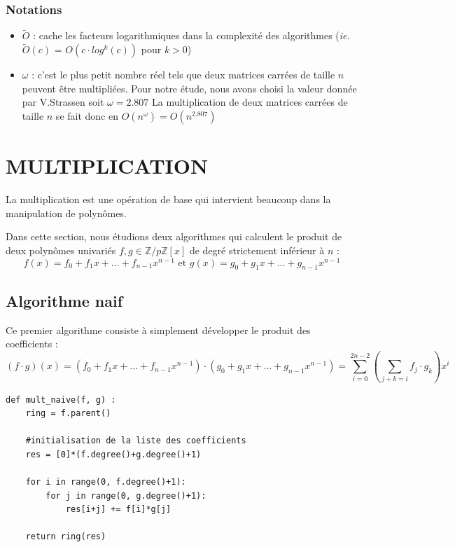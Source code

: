 \documentclass[a4paper]{article}
\begin{document}
\subsubsection*{Notations}
\begin{itemize}
\item $\tilde{O}$ : cache les facteurs logarithmiques dans la complexité des algorithmes (\textit{ie.} $\tilde{O}(c)$ = $O(c\cdot log^{k}(c))$ pour $k>0$)
\item $\omega$ : c'est le plus petit nombre réel tels que deux matrices carrées de taille $n$ peuvent être multipliées. Pour notre étude, nous avons choisi la valeur donnée par V.Strassen soit $\omega=2.807$
La multiplication de deux matrices carrées de taille $n$ se fait donc en $O(n^\omega)=O(n^{2.807})$
\end{itemize}


\section{MULTIPLICATION}

La multiplication est une opération de base qui intervient beaucoup dans la manipulation de polynômes.

Dans cette section, nous étudions deux algorithmes qui calculent le produit de deux polynômes univariés $f,g \in \mathbb{Z}/p\mathbb{Z}[x]$ de degré strictement inférieur à $n$ :
\[
f(x)=f_0+f_1x+...+f_{n-1}x^{n-1}\text{ et }g(x)=g_0+g_1x+...+g_{n-1}x^{n-1}
\]

\subsection{Algorithme naif}

Ce premier algorithme consiste à simplement développer le produit des coefficients :
\[
(f\cdot g)(x)=(f_0+f_1x+...+f_{n-1}x^{n-1})\cdot (g_0+g_1x+...+g_{n-1}x^{n-1})=\sum_{i=0}^{2n-2} (\sum_{j+k=i}f_j\cdot g_k) x^i
\]

\begin{lstlisting}[title={multiplication naive}]
    def mult_naive(f, g) :
    ring = f.parent()

    #initialisation de la liste des coefficients
    res = [0]*(f.degree()+g.degree()+1) 
    
    for i in range(0, f.degree()+1):
        for j in range(0, g.degree()+1):
            res[i+j] += f[i]*g[j]

    return ring(res) 
\end{lstlisting}
\end{document}
